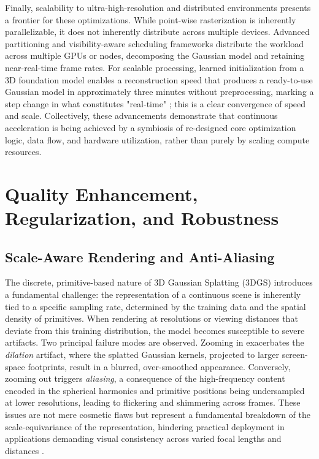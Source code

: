 \documentclass[11pt,a4paper]{article}
\begin{document}
Finally, scalability to ultra-high-resolution and distributed environments presents a frontier for these optimizations. While point-wise rasterization is inherently parallelizable, it does not inherently distribute across multiple devices. Advanced partitioning and visibility-aware scheduling frameworks distribute the workload across multiple GPUs or nodes, decomposing the Gaussian model and retaining near-real-time frame rates. For scalable processing, learned initialization from a 3D foundation model enables a reconstruction speed that produces a ready-to-use Gaussian model in approximately three minutes without preprocessing, marking a step change in what constitutes "real-time" \cite{arxiv:2607.03209v1}; this is a clear convergence of speed and scale. Collectively, these advancements demonstrate that continuous acceleration is being achieved by a symbiosis of re-designed core optimization logic, data flow, and hardware utilization, rather than purely by scaling compute resources.


\section{Quality Enhancement, Regularization, and Robustness}



\subsection{Scale-Aware Rendering and Anti-Aliasing}


The discrete, primitive-based nature of 3D Gaussian Splatting (3DGS) introduces a fundamental challenge: the representation of a continuous scene is inherently tied to a specific sampling rate, determined by the training data and the spatial density of primitives. When rendering at resolutions or viewing distances that deviate from this training distribution, the model becomes susceptible to severe artifacts. Two principal failure modes are observed. Zooming in exacerbates the \emph{dilation} artifact, where the splatted Gaussian kernels, projected to larger screen-space footprints, result in a blurred, over-smoothed appearance. Conversely, zooming out triggers \emph{aliasing}, a consequence of the high-frequency content encoded in the spherical harmonics and primitive positions being undersampled at lower resolutions, leading to flickering and shimmering across frames. These issues are not mere cosmetic flaws but represent a fundamental breakdown of the scale-equivariance of the representation, hindering practical deployment in applications demanding visual consistency across varied focal lengths and distances \cite{arxiv:2401.03890v2,arxiv:2407.17418v1}.
\end{document}
